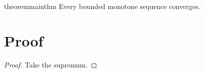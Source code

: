 \documentclass{article}
\begin{document}
\begin{restatable}{theorem}{mainthm}
Every bounded monotone sequence converges.
\end{restatable}
\section{Proof}
\mainthm*
\begin{proof}
Take the supremum.
\end{proof}
\end{document}
